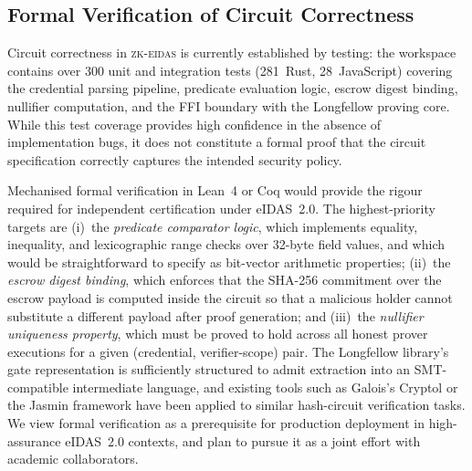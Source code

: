 \subsection{Formal Verification of Circuit Correctness}\label{sec:disc-formal}

Circuit correctness in \textsc{zk-eidas} is currently established by testing: the
workspace contains over 300 unit and integration tests (281~Rust, 28~JavaScript) covering the credential parsing
pipeline, predicate evaluation logic, escrow digest binding, nullifier computation, and
the FFI boundary with the Longfellow proving core.
While this test coverage provides high confidence in the absence of implementation bugs,
it does not constitute a formal proof that the circuit specification correctly captures
the intended security policy.

Mechanised formal verification in Lean~4 or Coq would provide the rigour required for
independent certification under eIDAS~2.0.
The highest-priority targets are (i)~the \emph{predicate comparator logic}, which
implements equality, inequality, and lexicographic range checks over 32-byte field
values, and which would be straightforward to specify as bit-vector arithmetic
properties; (ii)~the \emph{escrow digest binding}, which enforces that the SHA-256
commitment over the escrow payload is computed inside the circuit so that a malicious
holder cannot substitute a different payload after proof generation; and
(iii)~the \emph{nullifier uniqueness property}, which must be proved to hold across all
honest prover executions for a given (credential, verifier-scope) pair.
The Longfellow library's gate representation is sufficiently structured to admit
extraction into an SMT-compatible intermediate language, and existing tools such as
Galois's Cryptol or the Jasmin framework have been applied to similar hash-circuit
verification tasks.
We view formal verification as a prerequisite for production deployment in
high-assurance eIDAS~2.0 contexts, and plan to pursue it as a joint effort with
academic collaborators.
